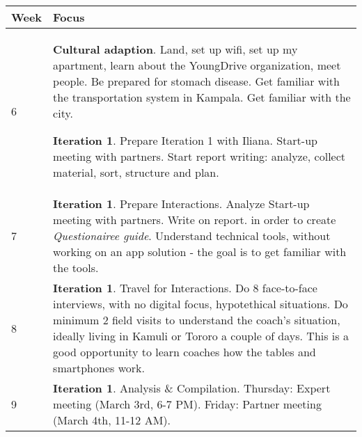\begin{center}
    \begin{tabular}{ | l | p{10cm} |}
    \hline
    Week & Focus \\ \hline
    6 & \textbf{Cultural adaption}. Land, set up wifi, set up my apartment, learn about the YoungDrive organization, meet people. Be prepared for stomach disease. Get familiar with the transportation system in Kampala. Get familiar with the city. 
    
    \textbf{Iteration 1}. Prepare Iteration 1 with Iliana. %
    Start-up meeting with partners. %
    Start report writing: analyze, collect material, sort, structure and plan.
    \\ \hline 
    7 & \textbf{Iteration 1}. Prepare Interactions. Analyze Start-up meeting with partners. Write on report. %
    in order to create \textit{Questionairee guide}. Understand technical tools, without working on an app solution - the goal is to get familiar with the tools. %
    \\ \hline
    8 & \textbf{Iteration 1}. Travel for Interactions. Do 8 face-to-face interviews, with no digital focus, hypotethical situations. Do minimum 2 field visits to understand the coach's situation, ideally living in Kamuli or Tororo a couple of days. This is a good opportunity to learn coaches how the tables and smartphones work.  \\ \hline %
    
    9 & \textbf{Iteration 1}. Analysis \& Compilation. Thursday: Expert meeting (March 3rd, 6-7 PM). Friday: Partner meeting (March 4th, 11-12 AM).
    

\end{tabular}
\end{center}
